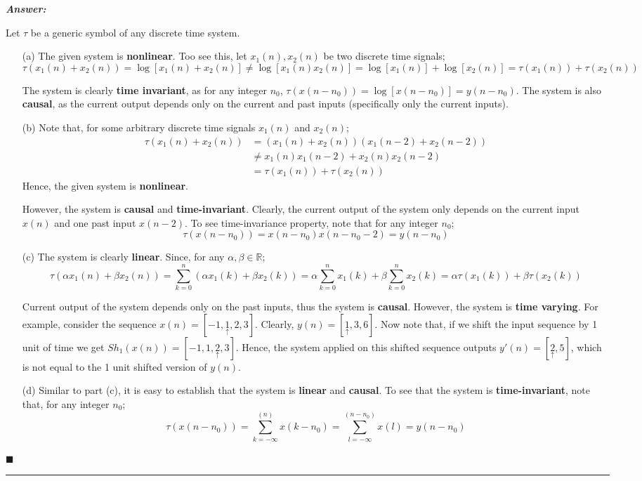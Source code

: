 \documentclass[12pt]{article}
\theoremstyle{definition}
\newenvironment{answer}{
    \textbf{\textit{Answer:}} \qquad
}{\hfill $\blacksquare$ \\ \begin{center}
    \rule{0.6\linewidth}{0.5px}    
\end{center}
}
\newcommand{\R}{\mathbb{R}}
\begin{document}
\begin{answer}
    Let $\tau$ be a generic symbol of any discrete time system.
    \begin{enumerate}
        \item[(a)] The given system is \textbf{nonlinear}. Too see this, let $x_1(n), x_2(n)$ be two discrete time signals;
        $$
        \tau(x_1(n) + x_2(n)) = \log[x_1(n) + x_2(n)] \neq \log[x_1(n)x_2(n)] = \log[x_1(n)] + \log[x_2(n)] = \tau(x_1(n)) + \tau(x_2(n))
        $$ 

        The system is clearly \textbf{time invariant}, as for any integer $n_0$, $\tau(x(n-n_0)) = \log[x(n-n_0)] = y(n-n_0)$. The system is also \textbf{causal}, as the current output depends only on the current and past inputs (specifically only the current inputs).

        \item[(b)] Note that, for some arbitrary discrete time signals $x_1(n)$ and $x_2(n)$;
        \begin{align*}
            \tau(x_1(n) + x_2(n))
            & = (x_1(n) + x_2(n))(x_1(n-2) + x_2(n-2))\\
            & \neq x_1(n)x_1(n-2) + x_2(n)x_2(n-2)\\
            & = \tau(x_1(n)) + \tau(x_2(n))
        \end{align*} 
        Hence, the given system is \textbf{nonlinear}.

        However, the system is \textbf{causal} and \textbf{time-invariant}. Clearly, the current output of the system only depends on the current input $x(n)$ and one past input $x(n-2)$. To see time-invariance property, note that for any integer $n_0$;
        $$
        \tau(x(n-n_0)) = x(n-n_0)x(n - n_0 - 2) = y(n-n_0)
        $$
        \item[(c)] The system is clearly \textbf{linear}. Since, for any $\alpha, \beta \in \R$;
        $$
        \tau(\alpha x_1(n) + \beta x_2(n)) = \sum_{k = 0}^{n} \left( \alpha x_1(k) + \beta x_2(k) \right) = \alpha \sum_{k = 0}^{n} x_1(k) + \beta \sum_{k = 0}^{n} x_2(k) = \alpha \tau(x_1(k)) + \beta \tau(x_2(k))
        $$ 

        Current output of the system depends only on the past inputs, thus the system is \textbf{causal}. However, the system is \textbf{time varying}. For example, consider the sequence $x(n) = [-1, \underset{\uparrow}{1}, 2, 3]$. Clearly, $y(n) = [\underset{\uparrow}{1}, 3, 6]$. Now note that, if we shift the input sequence by 1 unit of time we get $Sh_1(x(n)) = [-1, 1, \underset{\uparrow}{2}, 3]$. Hence, the system applied on this shifted sequence outputs $y'(n) = [\underset{\uparrow}{2}, 5]$, which is not equal to the 1 unit shifted version of $y(n)$.
        \item[(d)] Similar to part (c), it is easy to establish that the system is \textbf{linear} and \textbf{causal}. To see that the system is \textbf{time-invariant}, note that, for any integer $n_0$;
        $$
        \tau(x(n-n_0)) = \sum_{k = -\infty}^{(n)} x(k-n_0) =\sum_{l = -\infty}^{(n - n_0)} x(l) = y(n-n_0) 
        $$  
    \end{enumerate}
\end{answer}
\end{document}
